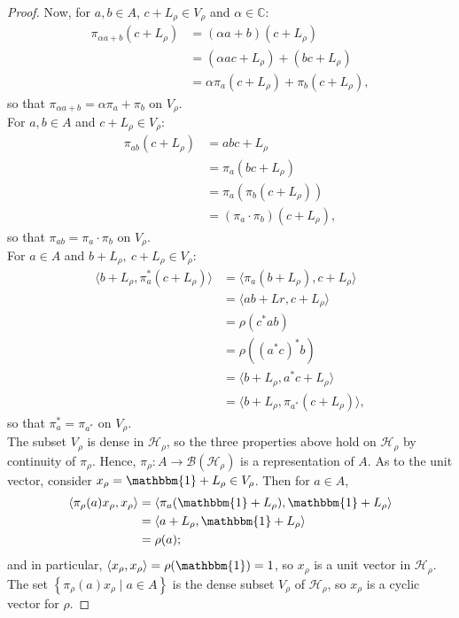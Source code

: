\documentclass[11pt,a4paper]{report}
\theoremstyle{plain}
\theoremstyle{definition}
\newcommand{\1}{\mathbbm{1}}
\newcommand{\B}{\mathcal{B}}
\newcommand{\Hr}{\mathcal{H}_\rho}
\newcommand{\Vr}{V_\rho}
\newcommand{\Lr}{L_\rho}
\newcommand{\xr}{x_\rho}
\begin{document}
\begin{proof}
	Now, for $a,b \in A$, $c+ L_\rho \in \Vr$ and $\alpha \in \mathbb{C}$:
	\begin{align*}
				\pi_{\alpha a+b}(c+\Lr)
		&=		(\alpha a+b) (c+\Lr)										\\
		&=		(\alpha ac +\Lr) + (bc+\Lr)									\\
		&=		\alpha \pi_a (c+\Lr) + \pi_b(c+\Lr),
	\end{align*}
	so that $\pi_{\alpha a + b} = \alpha \pi_a +\pi_b$ on $\Vr$.\\
	For $a,b \in A$ and $c+ L_\rho \in \Vr$:
	\begin{align*}
		\pi_{ab}(c+\Lr)
		&=		abc+\Lr														\\
		&=		\pi_a (bc+\Lr)												\\
		&=		\pi_a (\pi_b (c+\Lr))										\\
		&=		(\pi_a \cdot \pi_b) (c+\Lr),
	\end{align*}
	so that $\pi_{a b} = \pi_a \cdot \pi_b$ on $\Vr$.\\
	For $a\in A$ and $b+ L_\rho,~c+ L_\rho \in \Vr$:
	\begin{align*}
				\langle b+\Lr, \pi_a^\ast (c+\Lr) \rangle 
		&=		\langle \pi_a (b+\Lr), c+\Lr \rangle						\\
		&=		\langle ab +Lr, c+\Lr \rangle								\\
		&=		\rho(c^\ast ab)												\\
		&=		\rho((a^\ast c)^\ast b)										\\
		&=		\langle b+\Lr, a^\ast c+\Lr \rangle							\\
		&=		\langle b+\Lr, \pi_{a^\ast}(c+\Lr)\rangle,
	\end{align*}
	so that $ \pi_a^\ast = \pi_{a^\ast}$ on $\Vr$.\\
	The subset $\Vr$ is dense in $\Hr$, so the three properties above hold on $\Hr$ by continuity of 
	$\pi_\rho$. Hence, $\pi_\rho: A \to \B(\Hr)$ is a representation of $A$.
	As to the unit vector, consider $\xr = \1 + \Lr \in \Vr$. Then for $a \in A$,
	\begin{align*}
				\langle \pi_\rho(a)\xr ,\xr \rangle 
		&=		\langle \pi_a(\1+\Lr), \1+\Lr \rangle						\\
		&=		\langle a+\Lr, \1+\Lr \rangle								\\
		&=		\rho(a);
	\end{align*}
	and in particular, $\langle \xr,\xr \rangle = \rho (\1) = 1$, so $\xr$ is a unit vector in $\Hr$. 
	The set $\left\{\pi_\rho(a)x_\rho \mid a\in A\right\}$ is the dense subset $\Vr$ of $\Hr$, so $x_\rho$ is a 
	cyclic vector for $\rho$.
\end{proof}
\end{document}
